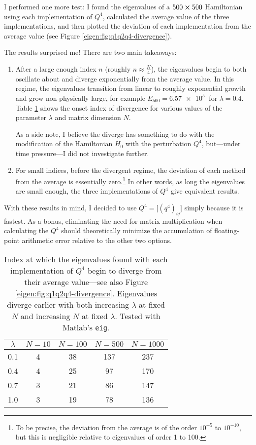 \documentclass[11pt, a4paper]{article}
\begin{document}
I performed one more test: I found the eigenvalues of a $ 500 \cross 500 $ Hamiltonian using each implementation of $ Q^{4} $, calculated the average value of the three implementations, and then plotted the deviation of each implementation from the average value (see Figure \ref{eigen:fig:q1q2q4-divergence}).

The results surprised me! There are two main takeaways: 
\begin{enumerate}
	\item After a large enough index $ n $ (roughly $ n \approx \frac{N}{4} $), the eigenvalues begin to both oscillate about and diverge exponentially from the average value. In this regime, the eigenvalues transition from linear to roughly exponential growth and grow non-physically large, for example $ E_{500} = \SI{6.57e5}{} $ for $ \lambda = 0.4 $. Table \ref{eigen:table:eigenvalue-convergence} shows the onset index of divergence for various values of the parameter $ \lambda $ and matrix dimension $ N $. 
	
	As a side note, I believe the diverge has something to do with the modification of the Hamiltonian $ H_{0} $ with the perturbation $ Q^{4} $, but---under time pressure---I did not investigate further.
	
	\item For small indices, before the divergent regime, the deviation of each method from the average is essentially zero.\footnote{To be precise, the deviation from the average is of the order $ 10^{-5} $ to $ 10^{-10} $, but this is negligible relative to eigenvalues of order 1 to 100.} In other words, as long the eigenvalues are small enough, the three implementations of $ Q^{4} $ give equivalent results. 
	
\end{enumerate}
With these results in mind, I decided to use $ Q^{4} = \big[(q^{4})_{ij}\big] $ simply because it is fastest. As a bonus, eliminating the need for matrix multiplication when calculating the $ Q^{4} $ should theoretically minimize the accumulation of floating-point arithmetic error relative to the other two options.


\begin{table}[h]
\begin{center}
	\begin{tabular}{c|c c c c}
		$\lambda$ & $ N = 10 $ & $ N = 100 $ & $ N = 500 $& $ N = 1000 $ \\
		\hline
		0.1 & 4 & 38 & 137 & 237 \\
		0.4 & 4 & 25 & 97 & 170 \\
		0.7 & 3 & 21 & 86 & 147 \\
		1.0 & 3 & 19 & 78 & 136
	\end{tabular}
	\caption{Index at which the eigenvalues found with each implementation of $ Q^{4} $ begin to diverge from their average value---see also Figure \ref{eigen:fig:q1q2q4-divergence}. Eigenvalues diverge earlier with both increasing $ \lambda $  at fixed $ N $ and increasing $ N $ at fixed $ \lambda $. Tested with Matlab's \texttt{eig}.}
	\label{eigen:table:eigenvalue-convergence}
\end{center}
\end{table}
\end{document}
